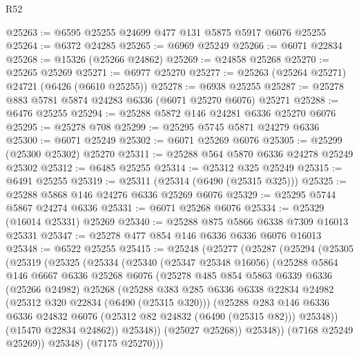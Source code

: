 \begin{lexlean}{R52}
\begin{coremodule}
@25263 := @6595 @25255 @24699 @477 @131 @5875 @5917 @6076 @25255
@25264 := @6372 @24285
@25265 := @6969 @25249
@25266 := @6071 @22834
@25268 := @15326 (@25266 @24862)
@25269 := @24858 @25268
@25270 := @25265 @25269
@25271 := @6977 @25270
@25277 := @25263 (@25264 @25271) @24721 (@6426 (@6610 @25255))
@25278 := @6938 @25255
@25287 := @25278 @883 @5781 @5874 @24283 @6336 (@6071 @25270 @6076) @25271
@25288 := @6476 @25255
@25294 := @25288 @5872 @146 @24281 @6336 @25270 @6076
@25295 := @25278 @708
@25299 := @25295 @5745 @5871 @24279 @6336
@25300 := @6071 @25249
@25302 := @6071 @25269 @6076
@25305 := @25299 (@25300 @25302) @25270
@25311 := @25288 @564 @5870 @6336 @24278 @25249 @25302
@25312 := @6485 @25255
@25314 := @25312 @325 @25249
@25315 := @6491 @25255
@25319 := @25311 (@25314 (@6490 (@25315 @325)))
@25325 := @25288 @5868 @146 @24276 @6336 @25269 @6076
@25329 := @25295 @5744 @5867 @24274 @6336
@25331 := @6071 @25268 @6076
@25334 := @25329 (@16014 @25331) @25269
@25340 := @25288 @875 @5866 @6338 @7309 @16013 @25331
@25347 := @25278 @477 @854 @146 @6336 @6336 @6076 @16013
@25348 := @6522 @25255
@25415 := @25248
    (@25277
      (@25287
        (@25294
          (@25305
            (@25319
              (@25325
                (@25334
                  (@25340
                    (@25347 @25348 @16056)
                    (@25288
                      @5864
                      @146
                      @6667
                      @6336
                      @25268
                      @6076
                      (@25278
                        @485
                        @854
                        @5863
                        @6339
                        @6336
                        (@25266 @24982)
                        @25268
                        (@25288
                          @383
                          @285
                          @6336
                          @6338
                          @22834
                          @24982
                          (@25312 @320 @22834 (@6490 (@25315 @320)))
                          (@25288
                            @283
                            @146
                            @6336
                            @6336
                            @24832
                            @6076
                            (@25312 @82 @24832 (@6490 (@25315 @82)))
                            @25348))
                        (@15470 @22834 @24862))
                      @25348))
                  (@25027 @25268))
                @25348))
            (@7168 @25249 @25269))
          @25348)
        (@7175 @25270)))

\end{coremodule}
\end{lexlean}
